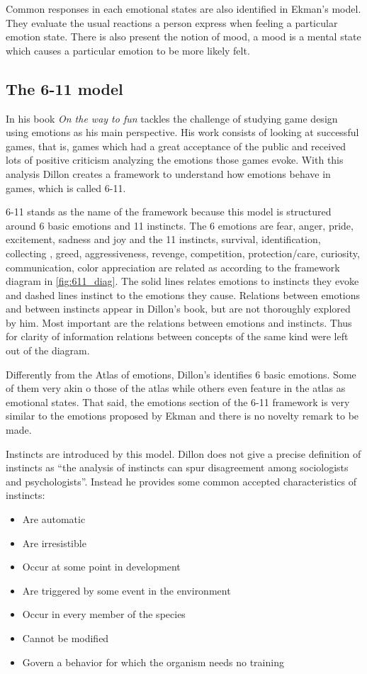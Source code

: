 Common responses in each emotional states are also identified in Ekman's model. They evaluate the usual reactions a person express when feeling a particular emotion state. There is also present the notion of mood, a mood is a mental state which causes a particular emotion to be more likely felt. 

\subsection{The 6-11 model}

In his book \textit{On the way to fun} \citeauthor{dillon_way_2010} tackles the challenge of studying game design using emotions as his main perspective. His work consists of looking at successful games, that is, games which had a great acceptance of the public and received lots of positive criticism analyzing the emotions those games evoke. With this analysis Dillon creates a framework to understand how emotions behave in games, which is called 6-11.

6-11 stands as the name of the framework because this model is structured around 6 basic emotions and 11 instincts. The 6 emotions are fear, anger, pride, excitement, sadness and joy and the 11 instincts, survival, identification, collecting
, greed, aggressiveness, revenge, competition, protection/care, curiosity, communication, color appreciation are related as according to the framework diagram in \autoref{fig:611_diag}. The solid lines relates emotions to instincts they evoke and dashed lines instinct to the emotions they cause. Relations between emotions and between instincts appear in Dillon's book, but are not thoroughly explored by him. Most important are the relations between emotions and instincts. Thus for clarity of information relations between concepts of the same kind were left out of the diagram. 



Differently from the Atlas of emotions, Dillon's identifies 6 basic emotions. Some of them very akin o those of the atlas while others even feature in the atlas as emotional states. That said, the emotions section of the 6-11 framework is very similar to the emotions proposed by Ekman and there is no novelty remark to be made.

Instincts are introduced by this model. Dillon does not give a precise definition of instincts as ``the analysis of instincts can spur disagreement among sociologists and psychologists''\citep{dillon_way_2010}. Instead he provides some common accepted characteristics of instincts:
\begin{itemize}
    \item Are automatic
    \item Are irresistible
    \item Occur at some point in development
    \item Are triggered by some event in the environment
    \item Occur in every member of the species
    \item Cannot be modified
    \item Govern a behavior for which the organism needs no 
training
\end{itemize}


